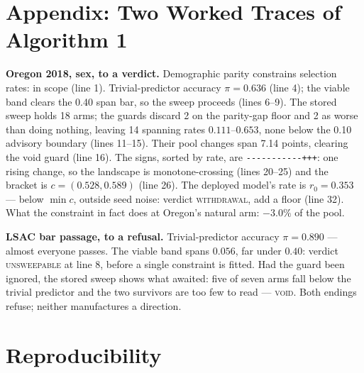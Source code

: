 \documentclass[9pt,conference]{IEEEtran}
\begin{document}
\section*{Appendix: Two Worked Traces of Algorithm 1}

\textbf{Oregon 2018, sex, to a verdict.} Demographic parity constrains selection rates:
in scope (line 1). Trivial-predictor accuracy $\pi = 0.636$ (line 4); the viable band
clears the 0.40 span bar, so the sweep proceeds (lines 6--9). The stored sweep holds 18
arms; the guards discard 2 on the parity-gap floor and 2 as worse than doing nothing,
leaving 14 spanning rates $0.111$--$0.653$, none below the 0.10 advisory boundary
(lines 11--15). Their pool changes span 7.14 points, clearing the void guard (line 16).
The signs, sorted by rate, are
\texttt{-{}-{}-{}-{}-{}-{}-{}-{}-{}-{}-{}+++}: one rising change, so the landscape is
monotone-crossing (lines 20--25) and the bracket is $c = (0.528, 0.589)$ (line 26). The
deployed model's rate is $r_0 = 0.353$ --- below $\min c$, outside seed noise: verdict
\textsc{withdrawal}, add a floor (line 32). What the constraint in fact does at Oregon's
natural arm: $-3.0\%$ of the pool.

\textbf{LSAC bar passage, to a refusal.} Trivial-predictor accuracy $\pi = 0.890$ ---
almost everyone passes. The viable band spans $0.056$, far under $0.40$: verdict
\textsc{unsweepable} at line 8, before a single constraint is fitted. Had the guard been
ignored, the stored sweep shows what awaited: five of seven arms fall below the trivial
predictor and the two survivors are too few to read --- \textsc{void}. Both endings
refuse; neither manufactures a direction.

\section*{Reproducibility}
\end{document}
